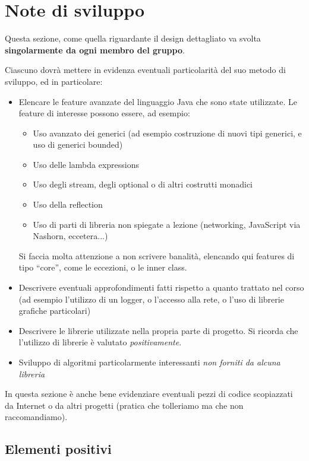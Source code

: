 \documentclass[a4paper,12pt]{report}
\begin{document}
\section{Note di sviluppo}

Questa sezione, come quella riguardante il design dettagliato va svolta \textbf{singolarmente da ogni membro del gruppo}.

Ciascuno dovrà mettere in evidenza eventuali particolarità del suo metodo di sviluppo, ed in particolare:
\begin{itemize}
	\item Elencare le feature avanzate del linguaggio Java che sono state utilizzate. Le feature di interesse possono essere, ad esempio:
	\begin{itemize}
		\item Uso avanzato dei generici (ad esempio costruzione di nuovi tipi generici, e uso di generici bounded)
		\item Uso delle lambda expressions
		\item Uso degli stream, degli optional o di altri costrutti monadici
		\item Uso della reflection
		\item Uso di parti di libreria non spiegate a lezione (networking, JavaScript via Nashorn, eccetera...)
	\end{itemize}
	Si faccia molta attenzione a non scrivere banalità, elencando qui features di tipo ``core'', come le eccezioni, o le inner class.
	\item Descrivere eventuali approfondimenti fatti rispetto a quanto trattato nel corso (ad esempio l'utilizzo di un logger, o l'accesso alla rete, o l'uso di librerie grafiche particolari)
	\item Descrivere le librerie utilizzate nella propria parte di progetto. Si ricorda che l'utilizzo di librerie è valutato \emph{positivamente}.
	\item Sviluppo di algoritmi particolarmente interessanti \emph{non forniti da alcuna libreria}
\end{itemize}

In questa sezione è anche bene evidenziare eventuali pezzi di codice scopiazzati da Internet o da altri progetti (pratica che tolleriamo ma che non raccomandiamo).

\subsection*{Elementi positivi}
\end{document}

